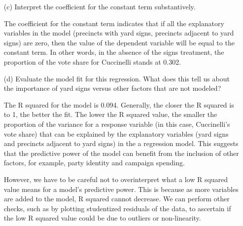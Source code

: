 \documentclass[12pt,letterpaper]{article}
\begin{document}
\begin{enumerate}
	\vspace{0.7cm}
	\item [(c)] Interpret the coefficient for the constant term substantively.
	\vspace{0.5cm}

\noindent The coefficient for the constant term indicates that if all the explanatory variables in the model (precincts with yard signs, precincts adjacent to yard signs) are zero, then the value of the dependent variable will be equal to the constant term. In other words, in the absence of the signs treatment, the proportion of the vote share for Cuccinelli stands at 0.302. 
	
	\item [(d)] Evaluate the model fit for this regression.  What does this	tell us about the importance of yard signs versus other factors that are not modeled?
	\vspace{0.5cm}

\noindent The R squared for the model is 0.094. Generally, the closer the R squared is to 1, the better the fit. The lower the R squared value, the smaller the proportion of the variance for a response variable (in this case, Cuccinelli's vote share) that can be explained by the explanatory variables (yard signs and precincts adjacent to yard signs) in the a regression model. This suggests that the predictive power of the model can benefit from the inclusion of other factors, for example, party identity and campaign spending.

\vspace{0.3cm}

\noindent However, we have to be careful not to overinterpret what a low R squared value means for a model's predictive power. This is because as more variables are added to the model, R squared cannot decrease. We can perform other checks, such as by plotting studentized residuals of the data, to ascertain if the low R squared value could be due to outliers or non-linearity.

	
\end{enumerate}  
\end{document}
